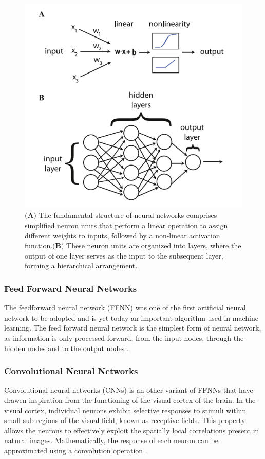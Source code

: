 \documentclass[a4paper, UKenglish, 11pt]{uiomaster}
\begin{document}
\begin{figure}
    \centering
    \includegraphics[width=\linewidth]{figures/basic_architecture.png}
    \caption{$\textbf{(A)}$ The fundamental structure of neural networks comprises simplified neuron units that perform a linear operation to assign different weights to inputs, followed by a non-linear activation function.$\textbf{(B)}$ These neuron units are organized into layers, where the output of one layer serves as the input to the subsequent layer, forming a hierarchical arrangement.}
    \label{fig:NN_basic_architecture}
\end{figure}


\subsubsection{Feed Forward Neural Networks}
The feedforward neural network (FFNN) was one of the first artificial neural network to be adopted and is yet today an important algorithm used in machine learning. The feed forward neural network is the simplest form of neural network, as information is only processed forward, from the input nodes, through the hidden nodes and to the output nodes \cite{Hjorth-Jensen2022}.


\subsubsection{Convolutional Neural Networks}
Convolutional neural networks (CNNs) is an other variant of FFNNs that have drawen inspiration from the functioning of the visual cortex of the brain. In the visual cortex, individual neurons exhibit selective responses to stimuli within small sub-regions of the visual field, known as receptive fields. This property allows the neurons to effectively exploit the spatially local correlations present in natural images. Mathematically, the response of each neuron can be approximated using a convolution operation \cite{Hjorth-Jensen2022}.
\end{document}

